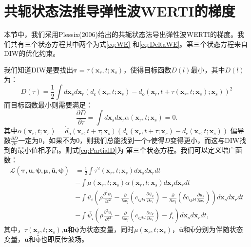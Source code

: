\chapter{共轭状态法推导弹性波WERTI的梯度}
\label{cha:AdjointForEWERTI}
本节中，我们采用Plessix(2006)给出的共轭状态法导出弹性波WERTI的梯度。我们共有三个状态方程其中两个为式\eqref{eq:WE}
和\eqref{eq:DeltaWE}。第三个状态方程来自DIW的优化约束。

我们知道DIW是要找出$\mathbf{\tau}=\tau(\mathbf{x}_r,t;\mathbf{x}_s)$，使得目标函数$D(l)$最小，其中$D(l)$为：
\begin{equation}
	D(\tau)=\frac{1}{2}\int
	d\mathbf{x}_sd\mathbf{x}_r(d_c(\mathbf{x}_r,t;\mathbf{x}_s)-
	d_o(\mathbf{x}_r,t+\tau(\mathbf{x}_r,t;\mathbf{x}_s);\mathbf{x}_s))^2
        \label{eq:Dl}
\end{equation}
而目标函数最小则需要满足：
\begin{equation}
	\frac{\partial D}{\partial \tau}=\int
	d\mathbf{x}_sd\mathbf{x}_r\alpha(\mathbf{x}_r,t;\mathbf{x}_s)=0.
        \label{eq:PartialD}
\end{equation}
其中$\alpha(\mathbf{x}_r,t;\mathbf{x}_s)=\dot{d}_o(\mathbf{x}_r,t+\tau;\mathbf{x}_s)(d_o(\mathbf{x}_r,t+\tau;\mathbf{x}_s)-
d_c(\mathbf{x}_r,t;\mathbf{x}_s))$
偏导数$\frac{\partial D}{\partial
\tau}$一定为0，如果不为0，则我们总能找到一个$\tau$使得$D$变得更小，而这与DIW找到的最小值相矛盾。则式\eqref{eq:PartialD}为
第三个状态方程。我们可以定义增广函数：
\begin{equation}
	\begin{split}
	\mathcal{L}(\mathbf{\tau},\mathbf{u},\mathbf{\psi},\mathbf{\mu},\bar{\mathbf{u}},\bar{\mathbf{\psi}})
	&=\frac{1}{2}\int \tau^2(\mathbf{x}_r,t;\mathbf{x}_s)d\mathbf{x}_sd\mathbf{x}_rdt\\
	&-\int
	\mu(\mathbf{x}_r,t;\mathbf{x}_s)\alpha(\mathbf{x}_r,t;\mathbf{x}_s)d\mathbf{x}_sd\mathbf{x}_rdt\\
	&-\int \bar{{u_i}}\left(\rho\frac{\partial^2
	\psi_i }{\partial t^2}-\frac{\partial}{\partial x_j}(c_{ijkl}\frac{\partial
	\psi_k}{\partial x_l})-\frac{\partial}{\partial x_j}(\delta
	c_{ijkl}\frac{\partial u_k}{\partial x_l})\right)d\mathbf{x}_sd\mathbf{x}_rdt\\
	&-\int \bar{{\psi_i}}\left(\rho\frac{\partial^2 u_i }{\partial
	t^2}-\frac{\partial}{\partial x_j}(c_{ijkl}\frac{\partial u_k}{\partial x_l}) -
	f_i\right)d\mathbf{x}_sd\mathbf{x}_rdt,
	\end{split}
        \label{eq:Lagrangian}
\end{equation}
其中，$\tau(\mathbf{x}_r,t;\mathbf{x}_s)$,$\mathbf{u}$和$\mathbf{\psi}$为状态变量，同时$\mu(\mathbf{x}_r,t;\mathbf{x}_s)$，$\bar{\mathbf{u}}$和$\bar{\mathbf{\psi}}$分别为伴随状态变量，$\bar{\mathbf{u}}$和$\bar{\mathbf{\psi}}$也即反传波场。

